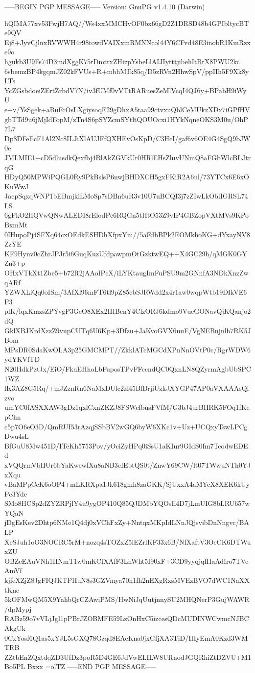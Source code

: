 -----BEGIN PGP MESSAGE-----
Version: GnuPG v1.4.10 (Darwin)

hQIMA77xv53FwjH7AQ//Ws4xxMMCHvOF0bx66gD2Z1DRSD48b4GPIbltycBTe9QV
Ej8+JyvCjlnxRVWWH4r98towdVAIXxmRMNNcol44Y6CFvd48E3inobR1KmRzxe9o
hgukb3U9Fs74D3mdXggK75rDmttxZHizpYsbeLlAIJIytttjibehItBrX8PWU2kc
6sbemzBP4kgqmJZ02kFVUs+R+mbhMJk85q/D5zRVn2HhwSpV/ppIIh5F9Xk8yLTs
YcZGsbdoeiZErtZrbdV7N/iv3fUMf0vVTtRARuesZeMlVcqI4QJ6y+BPabH9iWyU
e+v/YsSgek+aBuFcOsLXgiysoqE29gDhxA5taa99ctvxuQblCeMUkzXDx7iGPfHV
gbTTd9u6jMjIdFopM/zTn4S6pSYZcmSYtltQOUOcxi1HYkNqneOKS3M0u/OhP7L7
Dp8DFeEcF1Al2Nc8ILJiXlAUJFfQXHEvOsKpD/C3HcI/gaf6v6OE4G4SgQ9bJW0e
JMLMIE1+cD5dlusdkQexfbj4RlAkZGVkUr0HRlEHsZluvUNmQ8aFGbWlcBLJtrqG
HDyQ50MPWiPQGL0Ry9PkBslsP6nwjBHDXCH5gxFKiR2A6ul/73YTCx6E6xOKuWwJ
JaepSqxqWNP1bEBmjkiLMoSp7sDBn6uR3v10U7uBCQI3j7zZIwLkOblIGRSL74LS
6gFkO2HQVwQNwALEDI8rElodPc6RQGn5tHtO53Z9vIP4GBZopVXtMVs9KPoBxmMt
0IHupoPj4SFXq64cxOEdkESHDhXfpxYm//5aFdbBPk2EOMkhoKG+dYxayNV8ZzYE
KF9Hynv0cZhrJPJr5i6GuqKuzUfdpawpmOtGzktwEQ++X4GC29h/qMGK0GYZn3+p
OHxVTkXt1Zbe5+b72R2jAAoIPcX/iLYKtaugImFuPSU9m2GNnfA3NDkXnzZwqARf
YZWXLiQq0oISm/3AfXl96mFT6tl9pZ85cbSJRWdd2x4r1aw0wqpWtb19DIkVE6P3
plK/lqxKmzsZPYvgP3GeO8XEx2IHBcnY4ClzORJ6kdmo9VueGONavQjKQanjo2dQ
GklXBJKrdXzzZ9vupCUTq6U6Kp+3Dfzu+JaKvoGVX6uuE/VgNEBnjnlb7RK5JBom
MPsDR0SdaKwOLA3p25GMCMPT//ZkklATcMGCdXPnNnOVtP0c/RgrWDW6ydYKVfTD
N20HdkPztJx/EiO/FkuEHhoLbFuposTPvFFccndQC0QxnLN8QZyrmAgbUbSPC1WZ
lK3AZ8G5Rq/+mJZznRn6NaMxDUlc2zl45BfBrjiUzkJXYGP47AP0aVXAAAsQizvo
umYC0fASXXAW3gDz1qxlCxnZKZJ8FSWcfbusFVfM/G3bJ4urBHRK5FOq1fKepChn
c5p7O6eO3D/QmRUI53rAzqjSSbBV2wGQ6byW6XKc1v+Uz+UCQxyTswLPCgDwu4sL
BfGuU8Mw451D/ITeKh5753Pov/yOciZyHPq0iSsU1aKIur9GIdS0fm7TcodwEDEd
xVQQrmVbHUr6bYaKwcwfXu8aNB3eIEbtQS0t/ZnwY69CW/lt07TWwuNTh0YJxXqu
vBaMPpCcK6oOP4+mLKRXpa1Jk618gmh8zaGKK/SjUxxA4aMYcX8XEK6kUyPc3Yde
SMo8HCSp2dZYZRPjlY4u9ygOP410Q85QJDMbYQOsIi4D7jLmUIG8bLRU657wYQaN
jDgEsKev2Dhtp6NMe1Q4dj0xVChFxZy+NntqxMKpIdLNnJQjsvibDnNngvc/BALP
XeSJuh1oO3NOCRC5rM+nozq4sTOZxZ5iEZrlKF33x6B/NfXaftV3OeCK6DTWuxZU
OBZeEAuVNh1HNmT1w0mKCfXAfF3LhWht5I90xF+3CD9yyqjqfHaAdIro7TVeAmVf
kjfeXZjZ8JgFIQJKTPHuN8s3GZVmya70h1fh2nEXgRxsMVEzBVO7dWC1NaXXtKnc
5kOFMwQM5X9YahbQrCZAwiPMS/HwNiJqUutjnnySU2MHQNerP3GujWAWR/dpMypj
RABz59o7vVLjJgl1pPBrJZOBMFE59LzOnHxC5izcesQDcMUDINWCwmcNJBCAkgUk
0CxYosf6Q1as5xYJL5sGXQ78Gzqd8EAeKna0jxGfjXA3TiD/IHyEmA0Kzd3WMTRB
ZZtbEnZQxtdqZD3UfDz3poR5D4GE6JdVwELILW8URnodJGQRhiZtDZVU+M1Bo5PL
Bxxx
=olTZ
-----END PGP MESSAGE-----
